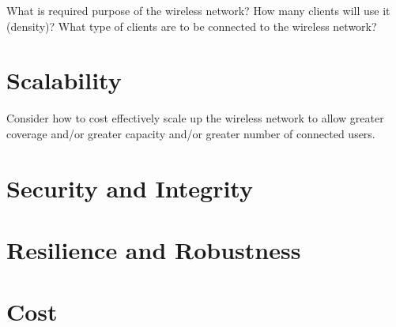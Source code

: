 What is required purpose of the wireless network?
How many clients will use it (density)?
What type of clients are to be connected to the wireless network?

\section{Scalability}
Consider how to cost effectively scale up the wireless network to allow greater coverage and/or greater capacity and/or greater number of connected users.


\section{Security and Integrity}



\section{Resilience and Robustness}



\section{Cost}




